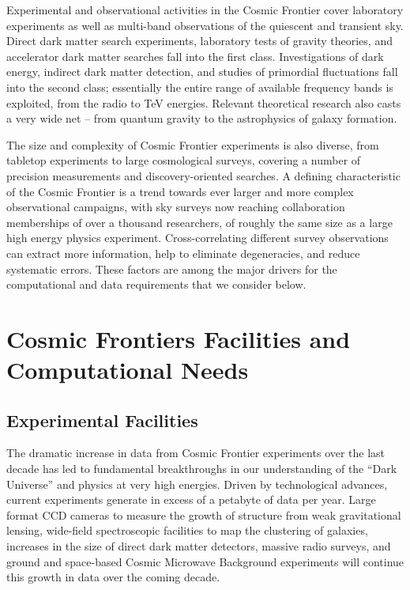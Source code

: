 Experimental and observational activities in the Cosmic Frontier cover
laboratory experiments as well as multi-band observations of the
quiescent and transient sky. Direct dark matter search experiments,
laboratory tests of gravity theories, and accelerator dark matter
searches fall into the first class. Investigations of dark energy,
indirect dark matter detection, and studies of primordial fluctuations
fall into the second class; essentially the entire range of available
frequency bands is exploited, from the radio to TeV energies. Relevant
theoretical research also casts a very wide net -- from quantum
gravity to the astrophysics of galaxy formation.

The size and complexity of Cosmic Frontier experiments is also
diverse, from tabletop experiments to large cosmological surveys,
covering a number of precision measurements and discovery-oriented
searches. A defining characteristic of the Cosmic Frontier is a trend
towards ever larger and more complex observational campaigns, with sky
surveys now reaching collaboration memberships of over a thousand
researchers, of roughly the same size as a large high energy physics
experiment. Cross-correlating different survey observations can
extract more information, help to eliminate degeneracies, and reduce
systematic errors. These factors are among the major drivers for the
computational and data requirements that we consider below.

\section{Cosmic Frontiers Facilities and Computational Needs}

\subsection{Experimental Facilities}
The dramatic increase in data from Cosmic Frontier experiments over
the last decade has led to fundamental breakthroughs in our
understanding of the “Dark Universe” and physics at very high
energies. Driven by technological advances, current experiments
generate in excess of a petabyte of data per year. Large format CCD cameras to
measure the growth of structure from weak gravitational lensing,
wide-field spectroscopic facilities to map the clustering of galaxies,
increases in the size of direct dark matter detectors, massive radio
surveys, and ground and space-based Cosmic Microwave Background
experiments will continue this growth in data over the coming decade.

